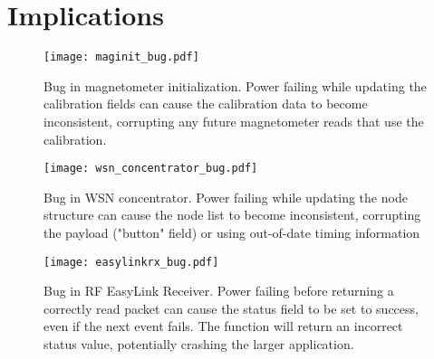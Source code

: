 \section{Implications}

\begin{figure}[ht]
\centering
\texttt{[image: maginit\_bug.pdf]}
\caption{Bug in magnetometer initialization. Power failing while updating the calibration fields can cause the calibration data to become inconsistent, corrupting any future magnetometer reads that use the calibration.}
\label{fig:mag}
\end{figure}

\begin{figure}[ht]
\centering
\texttt{[image: wsn\_concentrator\_bug.pdf]}
\caption{Bug in WSN concentrator. Power failing while updating the node structure can cause the node list to become inconsistent, corrupting the payload ("button" field) or using out-of-date timing information}
\label{fig:wsn}
\end{figure}

\begin{figure}[ht]
\centering
\texttt{[image: easylinkrx\_bug.pdf]}
\caption{Bug in RF EasyLink Receiver. Power failing before returning a correctly read packet can cause the status field to be set to success, even if the next event fails. The function will return an incorrect status value, potentially crashing the larger application.}
\label{fig:rf}
\end{figure}